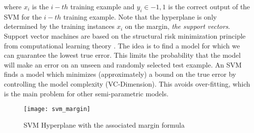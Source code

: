 where $x_i$ is the $i-th$ training example and $y_i \in {-1, 1}$
is the correct output of the SVM for the $i-th$ training
example. Note that the hyperplane is only determined
by the training instances $x_i$ on the margin, \textit{the support vectors}.
Support vector machines are based on the structural
risk minimization principle from computational
learning theory \cite{vapnik1999overview}. The idea is to find a model for which
we can guarantee the lowest true error. This limits
the probability that the model will make an error on
an unseen and randomly selected test example. An
SVM finds a model which minimizes (approximately)
a bound on the true error by controlling the model
complexity (VC-Dimension). This avoids over-fitting,
which is the main problem for other semi-parametric
models.
\begin{figure}[ht]
	\centering
	\texttt{[image: svm\_margin]}
	\caption[SVM Hyperplane margin]{SVM Hyperplane with the associated margin formula}
	\label{fig:svm_margin}
\end{figure}

